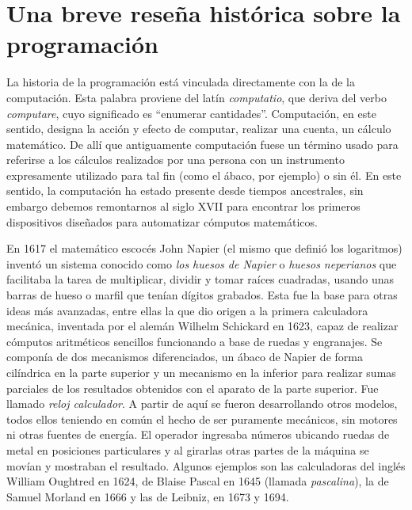 \documentclass[
]{book}
\begin{document}
\hypertarget{una-breve-reseuxf1a-histuxf3rica-sobre-la-programaciuxf3n}{%
\section{Una breve reseña histórica sobre la programación}\label{una-breve-reseuxf1a-histuxf3rica-sobre-la-programaciuxf3n}}

La historia de la programación está vinculada directamente con la de la computación. Esta palabra proviene del latín \emph{computatio}, que deriva del verbo \emph{computare}, cuyo significado es ``enumerar cantidades''. Computación, en este sentido, designa la acción y efecto de computar, realizar una cuenta, un cálculo matemático. De allí que antiguamente computación fuese un término usado para referirse a los cálculos realizados por una persona con un instrumento expresamente utilizado para tal fin (como el ábaco, por ejemplo) o sin él. En este sentido, la computación ha estado presente desde tiempos ancestrales, sin embargo debemos remontarnos al siglo XVII para encontrar los primeros dispositivos diseñados para automatizar cómputos matemáticos.

En 1617 el matemático escocés John Napier (el mismo que definió los logaritmos) inventó un sistema conocido como \emph{los huesos de Napier} o \emph{huesos neperianos} que facilitaba la tarea de multiplicar, dividir y tomar raíces cuadradas, usando unas barras de hueso o marfil que tenían dígitos grabados. Esta fue la base para otras ideas más avanzadas, entre ellas la que dio origen a la primera calculadora mecánica, inventada por el alemán Wilhelm Schickard en 1623, capaz de realizar cómputos aritméticos sencillos funcionando a base de ruedas y engranajes. Se componía de dos mecanismos diferenciados, un ábaco de Napier de forma cilíndrica en la parte superior y un mecanismo en la inferior para realizar sumas parciales de los resultados obtenidos con el aparato de la parte superior. Fue llamado \emph{reloj calculador}. A partir de aquí se fueron desarrollando otros modelos, todos ellos teniendo en común el hecho de ser puramente mecánicos, sin motores ni otras fuentes de energía. El operador ingresaba números ubicando ruedas de metal en posiciones particulares y al girarlas otras partes de la máquina se movían y mostraban el resultado. Algunos ejemplos son las calculadoras del inglés William Oughtred en 1624, de Blaise Pascal en 1645 (llamada \emph{pascalina}), la de Samuel Morland en 1666 y las de Leibniz, en 1673 y 1694.
\end{document}
